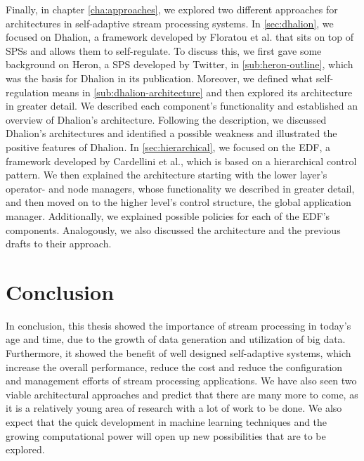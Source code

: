 \quad Finally, in chapter \ref{cha:approaches}, we explored two different approaches for architectures in self-adaptive 
stream processing systems.
In \ref{sec:dhalion}, we focused on Dhalion, a framework developed by Floratou et al. that sits on top of SPSs and allows them to self-regulate. 
To discuss this, we first gave some background on Heron, a SPS developed by Twitter, in \ref{sub:heron-outline}, which was the basis for Dhalion in its publication. 
Moreover, we defined what self-regulation means in \ref{sub:dhalion-architecture} and then explored its architecture in greater detail.
We described each component's functionality and established an overview of Dhalion's architecture.
Following the description, we discussed Dhalion's architectures and identified a possible weakness and illustrated the positive features of Dhalion.
In \ref{sec:hierarchical}, we focused on the EDF, a framework developed by Cardellini et al., which is based on a hierarchical control pattern.
We then explained the architecture starting with the lower layer's operator- and node managers, whose functionality we described in greater detail, 
and then moved on to the higher level's control structure, the global application manager. 
Additionally, we explained possible policies for each of the EDF's components. 
Analogously, we also discussed the architecture and the previous drafts to their approach.

\section{Conclusion}
\label{sec:conclusion}
In conclusion, this thesis showed the importance of stream processing in today's age and time, due to the 
growth of data generation and utilization of big data. Furthermore, it showed the benefit of well designed self-adaptive 
systems, which increase the overall performance, reduce the cost and reduce the configuration and management efforts of stream processing applications.
We have also seen two viable architectural approaches and predict that there are many more to come, as it is a relatively young 
area of research with a lot of work to be done. We also expect that the quick development in machine learning techniques and the growing computational 
power will open up new possibilities that are to be explored.
